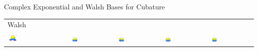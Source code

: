 \documentclass[11pt,compress,xcolor={usenames,dvipsnames},aspectratio=169]{beamer}
\begin{document}
\begin{frame}{Complex Exponential and Walsh Bases for Cubature}
\begin{tabular}{>{\centering}m{}>{\centering}m{}>{\centering}m{}>{\centering}m{}>{\centering}m{}}
\tabularnewline[-7ex]
Walsh \tabularnewline
\tabularnewline
\includegraphics[width =0.18\textwidth]{ProgramsImages/Walsh_Degree_1_1.png}  &
\includegraphics[width =0.18\textwidth]{ProgramsImages/Walsh_Degree_1_2.png}  &
\includegraphics[width =0.18\textwidth]{ProgramsImages/Walsh_Degree_1_3.png}  &
\includegraphics[width =0.18\textwidth]{ProgramsImages/Walsh_Degree_2_2.png}  &
\includegraphics[width =0.18\textwidth]{ProgramsImages/Walsh_Degree_2_3.png} 
	\end{tabular}
\end{frame}
\end{document}
